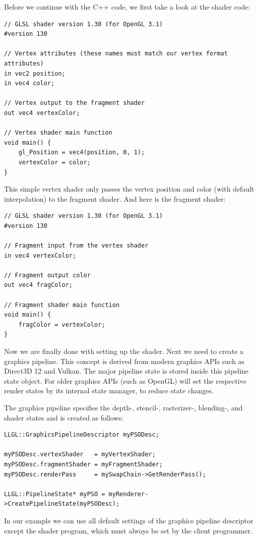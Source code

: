 \documentclass{article}
\begin{document}
Before we continue with the C++ code, we first take a look at the shader code:
\begin{lstlisting}[title={\texttt{vertex.glsl}}]
// GLSL shader version 1.30 (for OpenGL 3.1)
#version 130

// Vertex attributes (these names must match our vertex format attributes)
in vec2 position;
in vec4 color;

// Vertex output to the fragment shader
out vec4 vertexColor;

// Vertex shader main function
void main() {
    gl_Position = vec4(position, 0, 1);
    vertexColor = color;
}
\end{lstlisting}
This simple vertex shader only passes the vertex position and color (with default interpolation) to the fragment shader.
And here is the fragment shader:
\begin{lstlisting}[title={\texttt{fragment.glsl}}]
// GLSL shader version 1.30 (for OpenGL 3.1)
#version 130

// Fragment input from the vertex shader
in vec4 vertexColor;

// Fragment output color
out vec4 fragColor;

// Fragment shader main function
void main() {
    fragColor = vertexColor;
}
\end{lstlisting}

Now we are finally done with setting up the shader. Next we need to create a graphics pipeline.
This concept is derived from modern graphics APIs such as Direct3D 12 and Vulkan.
The major pipeline state is stored inside this pipeline state object.
For older graphics APIs (such as OpenGL) \LLGL will set the respective render states by its internal state manager,
to reduce state changes.

The graphics pipeline specifies the depth-, stencil-, rasterizer-, blending-,
and shader states and is created as follows:
\begin{lstlisting}
LLGL::GraphicsPipelineDescriptor myPSODesc;

myPSODesc.vertexShader   = myVertexShader;
myPSODesc.fragmentShader = myFragmentShader;
myPSODesc.renderPass     = mySwapChain->GetRenderPass();

LLGL::PipelineState* myPSO = myRenderer->CreatePipelineState(myPSODesc);
\end{lstlisting}
In our example we can use all default settings of the graphics pipeline descriptor except the shader program,
which must always be set by the client programmer.
\end{document}
